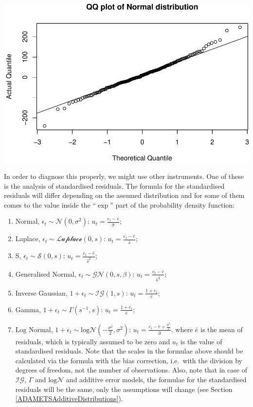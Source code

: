 \documentclass[
]{book}
\providecommand{\tightlist}{%
  \setlength{\itemsep}{0pt}\setlength{\parskip}{0pt}}
\theoremstyle{definition}
\theoremstyle{definition}
\theoremstyle{definition}
\theoremstyle{definition}
\theoremstyle{remark}
\begin{document}
\includegraphics{adam_files/figure-latex/unnamed-chunk-131-1.pdf}

In order to diagnose this properly, we might use other instruments. One of these is the analysis of standardised residuals. The formula for the standardised residuals will differ depending on the assumed distribution and for some of them comes to the value inside the ``\(\exp\)'' part of the probability density function:

\begin{enumerate}
\def\labelenumi{\arabic{enumi}.}
\tightlist
\item
  Normal, \(\epsilon_t \sim \mathcal{N}(0, \sigma^2)\): \(u_t = \frac{e_t - \bar{e}}{\hat{\sigma}}\);
\item
  Laplace, \(\epsilon_t \sim \mathcal{Laplace}(0, s)\): \(u_t = \frac{e_t - \bar{e}}{\hat{s}}\);
\item
  S, \(\epsilon_t \sim \mathcal{S}(0, s)\): \(u_t = \frac{e_t - \bar{e}}{\hat{s}^2}\);
\item
  Generalised Normal, \(\epsilon_t \sim \mathcal{GN}(0, s, \beta)\): \(u_t = \frac{e_t - \bar{e}}{\hat{s}^{\frac{1}{\beta}}}\);
\item
  Inverse Gaussian, \(1+\epsilon_t \sim \mathcal{IG}(1, s)\): \(u_t = \frac{1+e_t}{\bar{e}}\);
\item
  Gamma, \(1+\epsilon_t \sim \mathcal{\Gamma}(s^{-1}, s)\): \(u_t = \frac{1+e_t}{\bar{e}}\);
\item
  Log Normal, \(1+\epsilon_t \sim \mathrm{log}\mathcal{N}\left(-\frac{\sigma^2}{2}, \sigma^2\right)\): \(u_t = \frac{e_t - \bar{e} +\frac{\hat{\sigma}^2}{2}}{\hat{\sigma}}\).
  where \(\bar{e}\) is the mean of residuals, which is typically assumed to be zero and \(u_t\) is the value of standardised residuals. Note that the scales in the formulae above should be calculated via the formula with the bias correction, i.e.~with the division by degrees of freedom, not the number of observations. Also, note that in case of \(\mathcal{IG}\), \(\Gamma\) and \(\mathrm{log}\mathcal{N}\) and additive error models, the formulae for the standardised residuals will be the same, only the assumptions will change (see Section \ref{ADAMETSAdditiveDistributions}).
\end{enumerate}
\end{document}
